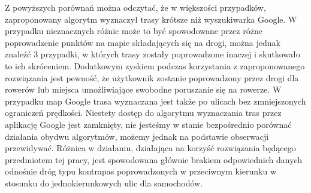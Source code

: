 Z powyższych porównań można odczytać, że w większości przypadków, zaproponowany algorytm wyznaczył trasy krótsze niż wyszukiwarka Google. W przypadku nieznacznych różnic może to być spowodowane przez różne poprowadzenie punktów na mapie składających się na drogi, można jednak znaleźć 3 przypadki, w których trasy zostały poprowadzone inaczej i skutkowało to ich skróceniem. Dodatkowym zyskiem podczas korzystania z zaproponowanego rozwiązania jest pewność, że użytkownik zostanie poprowadzony przez drogi dla rowerów lub miejsca umożliwiające swobodne poruszanie się na rowerze. W przypadku map Google trasa wyznaczana jest także po ulicach bez zmniejszonych ograniczeń prędkości. Niestety dostęp do algorytmu wyznaczania tras przez aplikację Google jest zamknięty, nie jesteśmy w stanie bezpośrednio porównać działania obydwu algorytmów, możemy jednak na podstawie obserwacji przewidywać. Różnica w działaniu, działająca na korzyść  rozwiązania będącego przedmiotem tej pracy, jest spowodowana głównie brakiem odpowiednich danych odnośnie dróg typu kontrapas poprowadzonych w przeciwnym kierunku w stosunku do jednokierunkowych ulic dla samochodów.